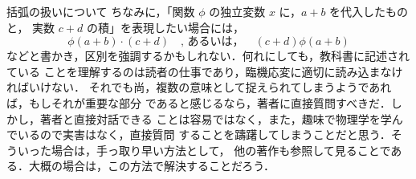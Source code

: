 \begin{preattention}{括弧の扱いについて}
        ちなみに，「関数 $\phi$ の独立変数 $x$ に，$a+b$ を代入したものと，
        実数 $c+d$ の積」を表現したい場合には，
            \begin{equation*}
                \phi(a+b) \cdot (c+d) \quad \mbox{, あるいは，} \quad (c+d)\phi(a+b)
            \end{equation*}
        などと書かき，区別を強調するかもしれない．何れにしても，教科書に記述されている
        ことを理解するのは読者の仕事であり，臨機応変に適切に読み込まなければいけない．
        それでも尚，複数の意味として捉えられてしまうようであれば，もしそれが重要な部分
        であると感じるなら，著者に直接質問すべきだ．しかし，著者と直接対話できる
        ことは容易ではなく，また，趣味で物理学を学んでいるので実害はなく，直接質問
        することを躊躇してしまうことだと思う．そういった場合は，手っ取り早い方法として，
        他の著作も参照して見ることである．大概の場合は，この方法で解決することだろう．


    \end{preattention}

